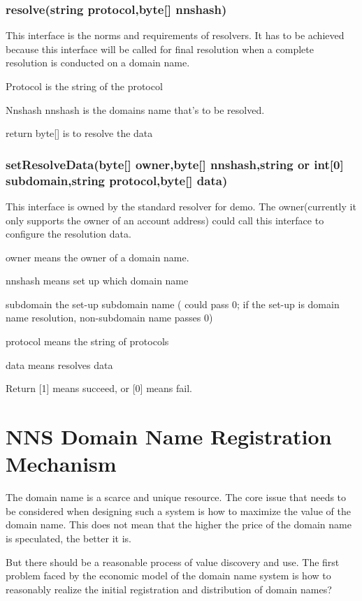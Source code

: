 \documentclass[letterpaper,10pt,english]{sphinxmanual}
\begin{document}
\subsubsection{resolve(string protocol,byte{[}{]} nnshash)}
\label{\detokenize{nns_protocol:resolve-string-protocol-byte-nnshash}}
This interface is the norms and requirements of resolvers. It has to be achieved because this interface will be called for final resolution when a complete resolution is conducted on a domain name.

Protocol  is the string of the protocol

Nnshash  nnshash is the domains name that’s to be resolved.

return byte{[}{]} is to resolve the data


\subsubsection{setResolveData(byte{[}{]} owner,byte{[}{]} nnshash,string or int{[}0{]} subdomain,string protocol,byte{[}{]} data)}
\label{\detokenize{nns_protocol:setresolvedata-byte-owner-byte-nnshash-string-or-int-0-subdomain-string-protocol-byte-data}}
This interface is owned by the standard resolver for demo. The owner(currently it only supports the owner of an account address) could call this interface to configure the resolution data.

owner means the owner of a domain name.

nnshash means set up which domain name

subdomain the set-up subdomain name ( could pass 0; if the set-up is domain name resolution, non-subdomain name passes 0)

protocol means the string of protocols

data means resolves data

Return {[}1{]} means succeed, or {[}0{]} means fail.


\section{NNS Domain Name Registration Mechanism}
\label{\detokenize{nns_protocol:nns-domain-name-registration-mechanism}}
The domain name is a scarce and unique resource.
The core issue that needs to be considered when designing such a system is how to maximize the value of the domain name.
This does not mean that the higher the price of the domain name is speculated, the better it is.

But there should be a reasonable process of value discovery and use.
The first problem faced by the economic model of the domain name system is how to reasonably realize the initial registration and distribution of domain names?
\end{document}
